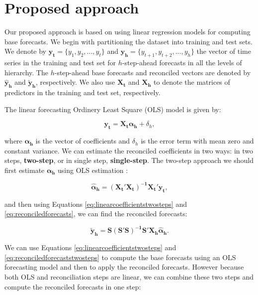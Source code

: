 \documentclass[11pt,a4paper,]{article}
\begin{document}
\section{Proposed approach}\label{proposed-approach}

Our proposed approach is based on using linear regression models for
computing base forecasts. We begin with partitioning the dataset into
training and test sets. We denote by
\(\mathbf{y_t}=\{y_1,y_2,...,y_t\}\) and
\(\mathbf{y_h}=\{y_{t+1},y_{t+2},...,y_h\}\) the vector of time series
in the training and test set for \(h\)-step-ahead forecasts in all the
levels of hierarchy. The \(h\)-step-ahead base forecasts and reconciled
vectors are denoted by \(\mathbf{\widehat{y}_{h}}\) and
\(\mathbf{\tilde{y}_{h}}\), respectively. We also use \(\mathbf{X_t}\)
and \(\mathbf{X_h}\) to denote the matrices of predictors in the
training and test set, respectively.

The linear forecasting Ordinery Least Square (OLS) model is given by:

\begin{equation}\label{eq:linearmodel}
   \mathbf{y_t} = \mathbf{X_t} \boldsymbol{\alpha_h}+\delta_h,
\end{equation}

where \(\boldsymbol{\alpha_h}\) is the vector of coefficients and
\(\delta_h\) is the error term with mean zero and constant variance. We
can estimate the reconciled coefficients in two ways: in two steps,
\textbf{two-step}, or in single step, \textbf{single-step}. The two-step
approach we should first estimate \(\boldsymbol{\alpha_h}\) using OLS
estimation :

\begin{equation}\label{eq:linearcoefficientstwosteps}
   \boldsymbol{\hat{\alpha}_h} = \mathbf{(X_t'X_t)^{-1}X_t'}\mathbf{y_t},
\end{equation}

and then using Equations \eqref{eq:linearcoefficientstwosteps} and
\eqref{eq:reconciledforecasts}, we can find the reconciled forecasts:

\begin{equation}\label{eq:reconciledforecaststwosteps}
   \boldsymbol{\tilde{y}_h} = \mathbf{S(S'S)^{-1}S'}\mathbf{X_h}\boldsymbol{\hat{\alpha}_h}.
\end{equation}

We can use Equations \eqref{eq:linearcoefficientstwosteps} and
\eqref{eq:reconciledforecaststwosteps} to compute the base forecasts using
an OLS forecasting model and then to apply the reconciled forecasts.
However because both OLS and reconciliation steps are linear, we can
combine these two steps and compute the reconciled forecasts in one
step:
\end{document}
